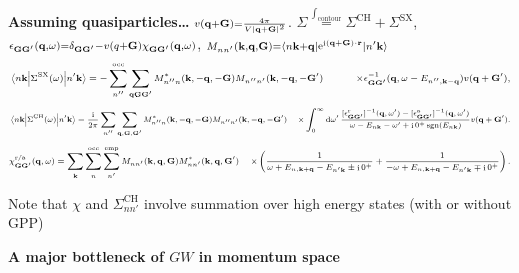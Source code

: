 \documentclass[t]{beamer}
\DeclareMathOperator{\ee}{e}
\DeclareMathOperator{\ii}{i}
\DeclareMathOperator{\sgn}{sgn}
\def\\{}%
\begin{document}
\begin{frame}[allowframebreaks]
\textbf{Assuming quasiparticles\dots} 
$\scriptstyle v(\vb{q} + \vb{G}) = \frac{4\pi }{V \abs*{\vb{q} + \vb{G}}^2}$.
$\scriptstyle \Sigma \stackrel{\int_{\text{contour}}}{=} \Sigma^{\text{CH}} + \Sigma^{\text{SX}}$,
$\scriptstyle \epsilon_{\vb{G} \vb{G}'}(\vb{q}, \omega) = \delta_{\vb{G} \vb{G}'} - v(q + \vb{G}) \chi_{\vb{G} \vb{G}'}(\vb{q}, \omega)$, 
$\scriptstyle M_{n n'}(\vb{k}, \vb{q}, \vb{G}) = \mel*{n \vb{k} + \vb{q}}{\ee^{\ii (\vb{q} + \vb{G}) \cdot \vb{r}}}{n' \vb{k}}$
\begin{equation*}
    \scriptsize
    \begin{aligned}
    \mel{n \vb{k}}{\Sigma^{\text{SX}}(\omega)}{n' \vb{k}} 
    &= - \sum_{n''}^{\text{occ}} \sum_{\vb{q} \vb{G} \vb{G}'}
    M^*_{n'' n} (\vb{k}, - \vb{q}, - \vb{G}) M_{n'' n'} (\vb{k}, - \vb{q},  -\vb{G}') \\
    &\quad\quad \times  \epsilon^{-1}_{\vb{G} \vb{G}'}(\vb{q}, \omega - E_{n'', \vb{k} - \vb{q}}) 
    v(\vb{q} + \vb{G}') ,
    \end{aligned}
    \label{eq:sex}
\end{equation*}
\begin{equation*}
    \scriptsize
    \begin{aligned}
        \mel{n \vb{k}}{\Sigma^{\text{CH}}(\omega)}{n' \vb{k}} 
        &= \frac{\ii}{2\pi} \sum_{n''} \sum_{\vb{q}, \vb{G}, \vb{G}'} 
        M^*_{n'' n} (\vb{k}, - \vb{q}, - \vb{G})  M_{n'' n'} (\vb{k}, - \vb{q},  -\vb{G}') \\
        & \times \int_{0}^{\infty} \dd{\omega'} 
        \frac{
            [\epsilon^{\text{r}}_{\vb{G} \vb{G}'}]^{-1} (\vb{q}, \omega')
            - [\epsilon^{\text{a}}_{\vb{G} \vb{G}'}]^{-1} (\vb{q}, \omega') 
        }{\omega - E_{n \vb{k}} - \omega' + \ii 0^+ \sgn(E_{n \vb{k}})} v(\vb{q}+\vb{G}') .
    \end{aligned}
    \label{eq:coh}
\end{equation*}
\begin{equation*}
    \scriptsize
    \begin{aligned}
        \chi^{\text{r/a}}_{\vb{G} \vb{G}'}(\vb{q}, \omega)
        &= \sum_{\vb{k}} \sum_{n}^{\text{occ}} \sum_{n'}^{\text{emp}} 
        M_{n n'} (\vb{k}, \vb{q}, \vb{G}) M^*_{nn'} (\vb{k}, \vb{q}, \vb{G}') \\
        &\times \left(
        \frac{
            1
        }{
            \omega + E_{n, \vb{k} + \vb{q}} - E_{n' \vb{k}} \pm \ii 0^+
        }
        + \frac{
            1
        }{
            - \omega + E_{n, \vb{k} + \vb{q}} - E_{n' \vb{k}} \mp \ii 0^+
        }
        \right).
    \end{aligned}
    \label{eq:chi}
\end{equation*}

Note that $\chi$ and $\Sigma_{nn'}^{\text{CH}}$ involve summation over high energy states 
(with or without GPP)

\textbf{A major bottleneck of $GW$ in momentum space}

\end{frame}
\end{document}
